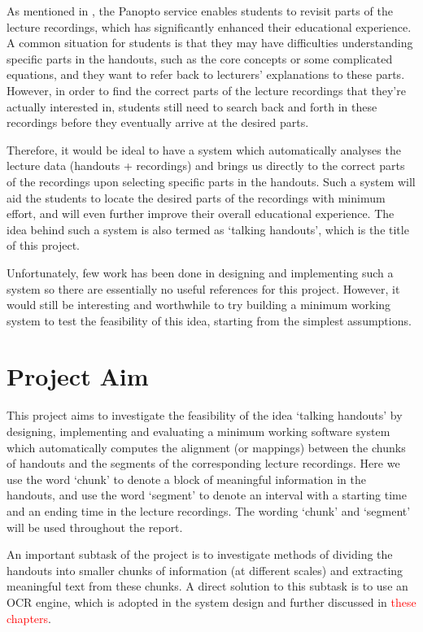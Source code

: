 As mentioned in , the Panopto service enables students to revisit parts of the lecture recordings, which has significantly enhanced their educational experience. A common situation for students is that they may have difficulties understanding specific parts in the handouts, such as the core concepts or some complicated equations, and they want to refer back to lecturers' explanations to these parts. However, in order to find the correct parts of the lecture recordings that they're actually interested in, students still need to search back and forth in these recordings before they eventually arrive at the desired parts.

Therefore, it would be ideal to have a system which automatically analyses the lecture data (handouts + recordings) and brings us directly to the correct parts of the recordings upon selecting specific parts in the handouts. Such a system will aid the students to locate the desired parts of the recordings with minimum effort, and will even further improve their overall educational experience. The idea behind such a system is also termed as `talking handouts', which is the title of this project.

Unfortunately, few work has been done in designing and implementing such a system so there are essentially no useful references for this project. However, it would still be interesting and worthwhile to try building a minimum working system to test the feasibility of this idea, starting from the simplest assumptions.


\section{Project Aim}

This project aims to investigate the feasibility of the idea `talking handouts' by designing, implementing and evaluating a minimum working software system which automatically computes the alignment (or mappings) between the chunks of handouts and the segments of the corresponding lecture recordings. Here we use the word `chunk' to denote a block of meaningful information in the handouts, and use the word `segment' to denote an interval with a starting time and an ending time in the lecture recordings. The wording `chunk' and `segment' will be used throughout the report.

An important subtask of the project is to investigate methods of dividing the handouts into smaller chunks of information (at different scales) and extracting meaningful text from these chunks. A direct solution to this subtask is to use an OCR engine, which is adopted in the system design and further discussed in \textcolor{red}{these chapters}.


